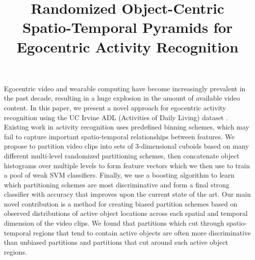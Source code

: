 \documentclass[extendedabs]{bmvc2k}
\begin{document}
\title{Randomized Object-Centric Spatio-Temporal Pyramids for Egocentric Activity Recognition}

%

\maketitle


\noindent
	Egocentric video and wearable computing have become increasingly
	prevalent in the past decade, resulting in a huge explosion in the amount
	of available video content. In this paper, we present a novel approach for
	egocentric activity recognition using the UC Irvine ADL (Activities of Daily Living)
	dataset \cite{Ramanan12}.  
  Existing work in activity recognition uses predefined binning schemes,
  which may fail to capture important spatio-temporal relationships between
  features.
  We propose to partition video clips into sets of
	3-dimensional cuboids based on many different multi-level randomized partitioning
	schemes, then concatenate object histograms
	over multiple levels to form feature vectors which we then use to train a pool
	of weak SVM classifiers. 
	Finally, we use a boosting algorithm to learn which partitioning schemes are
  most discriminative and form a
	final strong classifier with accuracy that improves upon the current state of
	the art. Our main novel contribution is a method for
	creating biased partition schemes based on observed distributions of
	active object locations across each spatial and temporal dimension of the video clips.
  We found that partitions which cut through spatio-temporal regions that
  tend to contain active objects are often more discriminative than
  unbiased partitions and 
  partitions that cut around such active object regions.


\end{document}
